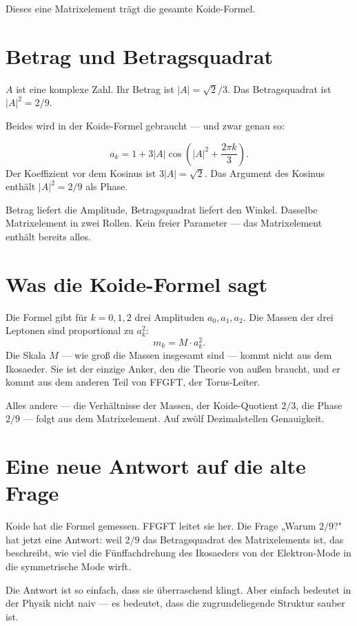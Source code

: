 \documentclass[12pt,oneside]{book}
\begin{document}
Dieses eine Matrixelement trägt die gesamte Koide-Formel.

\section{Betrag und Betragsquadrat}

$A$ ist eine komplexe Zahl. Ihr Betrag ist $|A| = \sqrt{2}/3$. Das Betragsquadrat ist $|A|^2 = 2/9$.

Beides wird in der Koide-Formel gebraucht — und zwar genau so:
\begin{merkbox}
\[
a_k = 1 + 3|A| \cos\left(|A|^2 + \frac{2\pi k}{3}\right).
\]
Der Koeffizient vor dem Kosinus ist $3|A| = \sqrt{2}$. Das Argument des Kosinus enthält $|A|^2 = 2/9$ als Phase.
\end{merkbox}

Betrag liefert die Amplitude, Betragsquadrat liefert den Winkel. Dasselbe Matrixelement in zwei Rollen. Kein freier Parameter — das Matrixelement enthält bereits alles.

\section{Was die Koide-Formel sagt}

Die Formel gibt für $k = 0, 1, 2$ drei Amplituden $a_0, a_1, a_2$. Die Massen der drei Leptonen sind proportional zu $a_k^2$:
\[
m_k = M \cdot a_k^2.
\]
Die Skala $M$ — wie groß die Massen insgesamt sind — kommt nicht aus dem Ikosaeder. Sie ist der einzige Anker, den die Theorie von außen braucht, und er kommt aus dem anderen Teil von FFGFT, der Torus-Leiter.

Alles andere — die Verhältnisse der Massen, der Koide-Quotient $2/3$, die Phase $2/9$ — folgt aus dem Matrixelement. Auf zwölf Dezimalstellen Genauigkeit.

\section{Eine neue Antwort auf die alte Frage}

Koide hat die Formel gemessen. FFGFT leitet sie her. Die Frage „Warum $2/9$?" hat jetzt eine Antwort: weil $2/9$ das Betragsquadrat des Matrixelements ist, das beschreibt, wie viel die Fünffachdrehung des Ikosaeders von der Elektron-Mode in die symmetrische Mode wirft.

Die Antwort ist so einfach, dass sie überraschend klingt. Aber einfach bedeutet in der Physik nicht naiv — es bedeutet, dass die zugrundeliegende Struktur sauber ist.
\end{document}
